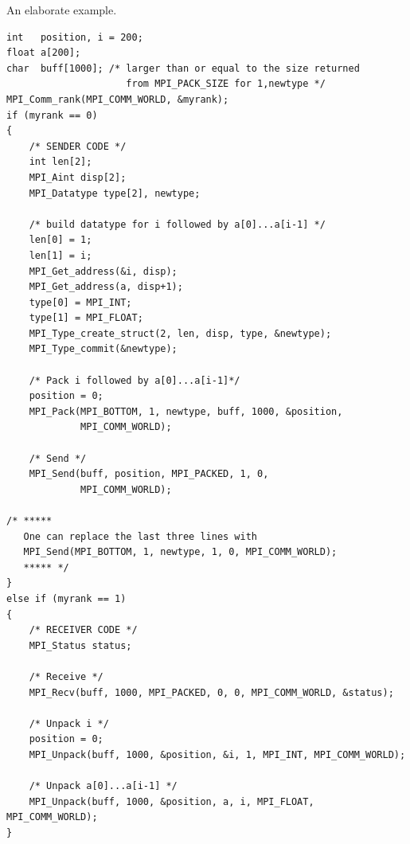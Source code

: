 \begin{example}
\label{pt2pt-exKK}
%
%
An elaborate example.
\begin{lstlisting}[language={[MPI]C}]
int   position, i = 200;
float a[200];
char  buff[1000]; /* larger than or equal to the size returned
                     from MPI_PACK_SIZE for 1,newtype */
MPI_Comm_rank(MPI_COMM_WORLD, &myrank);
if (myrank == 0)
{
    /* SENDER CODE */
    int len[2];
    MPI_Aint disp[2];
    MPI_Datatype type[2], newtype;

    /* build datatype for i followed by a[0]...a[i-1] */
    len[0] = 1;
    len[1] = i;
    MPI_Get_address(&i, disp);
    MPI_Get_address(a, disp+1);
    type[0] = MPI_INT;
    type[1] = MPI_FLOAT;
    MPI_Type_create_struct(2, len, disp, type, &newtype);
    MPI_Type_commit(&newtype);

    /* Pack i followed by a[0]...a[i-1]*/
    position = 0;
    MPI_Pack(MPI_BOTTOM, 1, newtype, buff, 1000, &position,
             MPI_COMM_WORLD);

    /* Send */
    MPI_Send(buff, position, MPI_PACKED, 1, 0,
             MPI_COMM_WORLD);

/* *****
   One can replace the last three lines with
   MPI_Send(MPI_BOTTOM, 1, newtype, 1, 0, MPI_COMM_WORLD);
   ***** */
}
else if (myrank == 1)
{
    /* RECEIVER CODE */
    MPI_Status status;

    /* Receive */
    MPI_Recv(buff, 1000, MPI_PACKED, 0, 0, MPI_COMM_WORLD, &status);

    /* Unpack i */
    position = 0;
    MPI_Unpack(buff, 1000, &position, &i, 1, MPI_INT, MPI_COMM_WORLD);

    /* Unpack a[0]...a[i-1] */
    MPI_Unpack(buff, 1000, &position, a, i, MPI_FLOAT, MPI_COMM_WORLD);
}
\end{lstlisting}
\end{example}

